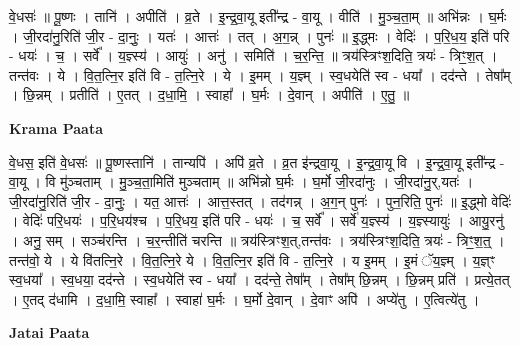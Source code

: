 \documentclass[17pt]{extarticle}
\begin{document}
वे॒धसः॑ ॥ पू॒ष्णः । तानि॑ । अपीति॑ । व्र॒ते । इ॒न्द्र॒वा॒यू इती᳚न्द्र - वा॒यू । वीति॑ । मु॒ञ्च॒ता॒म् ॥ अभि॑न्नः । घ॒र्मः । जी॒रदा॑नु॒रिति॑ जी॒र - दा॒नुः॒ । यतः॑ । आत्तः॑ । तत् । अ॒ग॒न्न् । पुनः॑ ॥ इ॒द्ध्मः । वेदिः॑ । प॒रि॒ध॒य॒ इति॑ परि - धयः॑ । च॒ । सर्वे᳚ । य॒ज्ञ्स्य॑ । आयुः॑ । अनु॑ । समिति॑ । च॒र॒न्ति॒ ॥ त्रय॑स्त्रिꣳश॒दिति॒ त्रयः॑ - त्रिꣳ॒॒श॒त् । तन्त॑वः । ये । वि॒त॒त्नि॒र इति॑ वि - त॒त्नि॒रे । ये । इ॒मम् । य॒ज्ञ्म् । स्व॒धयेति॑ स्व - धया᳚ । दद॑न्ते । तेषा᳚म् । छि॒न्नम् । प्रतीति॑ । ए॒तत् । द॒धा॒मि॒ । स्वाहा᳚ । घ॒र्मः । दे॒वान् । अपीति॑ । ए॒तु॒ ॥  \newline


\textbf{Krama Paata} \newline

वे॒धस॒ इति॑ वे॒धसः॑ ॥ पू॒ष्णस्तानि॑ । तान्यपि॑ । अपि॑ व्र॒ते । व्र॒त इ॑न्द्रवा॒यू । इ॒न्द्र॒वा॒यू वि । इ॒न्द्र॒वा॒यू इती᳚न्द्र - वा॒यू । वि मु॑ञ्चताम् । मु॒ञ्च॒ता॒मिति॑ मुञ्चताम् ॥ अभि॑न्नो घ॒र्मः । घ॒र्मो जी॒रदा॑नुः । जी॒रदा॑नु॒र्,यतः॑ । जी॒रदा॑नु॒रिति॑ जी॒र - दा॒नुः॒ । यत॒ आत्तः॑ । आत्त॒स्तत् । तद॑गन्न् । अ॒ग॒न् पुनः॑ । पुन॒रिति॒ पुनः॑ ॥ इ॒द्ध्मो वेदिः॑ । वेदिः॑ परि॒धयः॑ । प॒रि॒धय॑श्च । प॒रि॒धय॒ इति॑ परि - धयः॑ । च॒ सर्वे᳚ । सर्वे॑ य॒ज्ञ्स्य॑ । य॒ज्ञ्स्यायुः॑ । आयु॒रनु॑ । अनु॒ सम् । सञ्च॑रन्ति । च॒र॒न्तीति॑ चरन्ति ॥ त्रय॑स्त्रिꣳश॒त्,तन्त॑वः । त्रय॑स्त्रिꣳश॒दिति॒ त्रयः॑ - त्रिꣳ॒॒श॒त्॒ । तन्त॑वो॒ ये । ये वि॑तत्नि॒रे । वि॒त॒त्नि॒रे ये । वि॒त॒त्नि॒र इति॑ वि - त॒त्नि॒रे । य इ॒मम् । इ॒मं ॅय॒ज्ञ्म् । य॒ज्ञ्ꣳ स्व॒धया᳚ । स्व॒धया॒ दद॑न्ते । स्व॒धयेति॑ स्व - धया᳚ । दद॑न्ते॒ तेषा᳚म् । तेषा᳚म् छि॒न्नम् । छि॒न्नम् प्रति॑ । प्रत्ये॒तत् । ए॒तद् द॑धामि । द॒धा॒मि॒ स्वाहा᳚ । स्वाहा॑ घ॒र्मः । घ॒र्मो दे॒वान् । दे॒वाꣳ अपि॑ । अप्ये॑तु । ए॒त्वित्ये॑तु । \newline

\textbf{Jatai Paata} \newline
\end{document}
